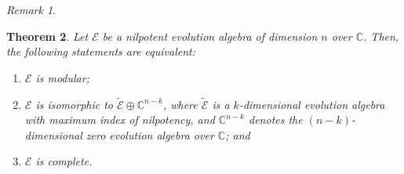 \documentclass[12pt,reqno]{amsart}
\theoremstyle{plain}%
\newtheorem{theorem}{Theorem}[section]%
\theoremstyle{definition}
\theoremstyle{remark}
\newtheorem{remark}[theorem]{Remark}
\newcommand{\E}{\mathcal{E}}
\numberwithin{equation}{section}
\begin{document}
\begin{remark}
\end{remark}

\begin{theorem}\label{th:equiv_mod}
	Let $\E$ be a nilpotent evolution algebra of dimension $n$ over $\mathbb{C}$. Then, the following statements are equivalent:
	\begin{enumerate}[\rm (i)]
		\item $\E$ is modular;
		\item $\E$ is isomorphic to $\widetilde{\E}\oplus\mathbb{C}^{n-k}$, where $\widetilde{\E}$ is a $k$-dimensional evolution algebra with maximum index of nilpotency, and $\mathbb{C}^{n-k}$ denotes the $(n-k)$-dimensional zero evolution algebra over $\mathbb{C}$; and
		\item $\E$ is complete.
	\end{enumerate}
\end{theorem}
\end{document}
